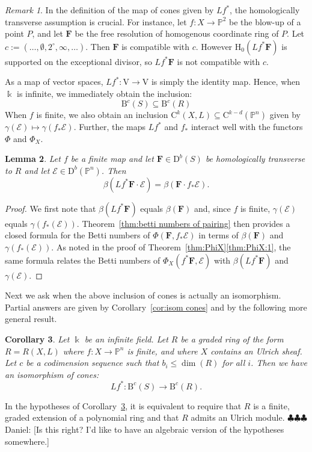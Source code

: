 \documentclass[12pt]{amsart}
\newtheorem{lemma}{Lemma}[section]
\newtheorem{cor}[lemma]{Corollary}
\theoremstyle{definition}
\theoremstyle{remark}
\newtheorem{remark}[lemma]{Remark}
\newcommand{\kk}{\Bbbk}
\newcommand{\PP}{\mathbb{P}}
\newcommand{\HH}{\mathrm{H}}
\newcommand{\VV}{\mathrm{V}}
\newcommand{\WW}{\mathrm{W}}
\newcommand{\bb}{c}
\newcommand{\cE}{\mathcal{E}}
\newcommand{\FF}{\mathbf{F}}
\newcommand{\zp}{\circ}
\newcommand{\nothing}{\emptyset}
\newcommand{\DD}{\mathrm{D}}
\newcommand{\CQ}{\mathrm{C}}
\newcommand{\BBQ}{\mathrm{B}}
\newcommand{\daniel}[1]{{\color{green} \sf $\clubsuit\clubsuit\clubsuit$ Daniel: [#1]}}
\begin{document}
\begin{remark}
In the definition of the map of cones given by $Lf^*$, the homologically transverse assumption is crucial.  For instance, let $f\colon X\to \PP^2$ be the blow-up of a point $P$, and let $\FF$ be the free resolution of homogenous coordinate ring of $P$.  Let $\bb:=(\dots,\nothing, 2^\zp,\infty,\dots)$.  Then $\FF$ is compatible with $\bb$.  However $\HH_0(Lf^*\FF)$ is supported on the exceptional divisor, so $Lf^*\FF$ is not compatible with $\bb$.
\end{remark}

As a map of vector spaces, $Lf^*\colon \VV\to \VV$ 
is simply the identity map.  Hence, when $\kk$ is infinite, we immediately obtain the inclusion:
\[
\BBQ^{\bb}(S)\subseteq \BBQ^{\bb}(R) 
\]
When $f$ is finite, we also obtain an inclusion $\CQ^k(X,L)\subseteq \CQ^{k-d}(\PP^n)$ given by $\gamma(\cE)\mapsto \gamma(f_*\cE)$.  
Further, the maps $Lf^*$ and $f_*$ interact well with the functors $\Phi$ and $\Phi_X$.

\begin{lemma}\label{lem:general pairing}
Let $f$ be a finite map and let $\FF\in \DD^b(S)$ be homologically transverse to $R$ and let $\cE\in \DD^b(\PP^n)$.  Then
\[
\beta(Lf^*\FF\cdot \cE)=\beta(\FF\cdot f_*\cE).
\]
\end{lemma}
\begin{proof}
We first note that $\beta(Lf^*\FF)$ equals $\beta(\FF)$ and, since $f$ is finite, $\gamma(\cE)$ equals $\gamma(f_*(\cE))$.  Theorem~\ref{thm:betti numbers of pairing} then provides a closed formula for the Betti numbers of $\Phi(\FF,f_*\cE)$ in terms of $\beta(\FF)$ and $\gamma(f_*(\cE))$.  As noted in the proof of Theorem~\ref{thm:PhiX}\eqref{thm:PhiX:1}, the same formula relates the Betti numbers of $\Phi_X(f^*\FF,\cE)$ with  $\beta(Lf^*\FF)$ and $\gamma(\cE)$.
\end{proof}

Next we ask when the above inclusion of cones is actually an isomorphism. Partial answers are given by Corollary~\ref{cor:isom cones} and by the following more general result.

\begin{cor}\label{cor:new graded rings}
Let $\kk$ be an infinite field.  Let $R$ be a graded ring of the form $R=R(X,L)$ where $f\colon X\to \PP^n$ is finite, and where $X$ contains an Ulrich sheaf.  Let $\bb$ be a codimension sequence such that $b_i\leq \dim(R)$ for all $i$.  Then we have  an isomorphism of cones:
\[
Lf^*\colon \BBQ^{\bb}(S)\to \BBQ^{\bb}(R).
\]
\end{cor}
In the hypotheses of Corollary~\ref{cor:new graded rings}, it is equivalent to require that $R$ is a finite, graded extension of a polynomial ring and that $R$ admits an Ulrich module.\daniel{Is this right?  I'd like to have an algebraic version of the hypotheses somewhere.}
\end{document}
